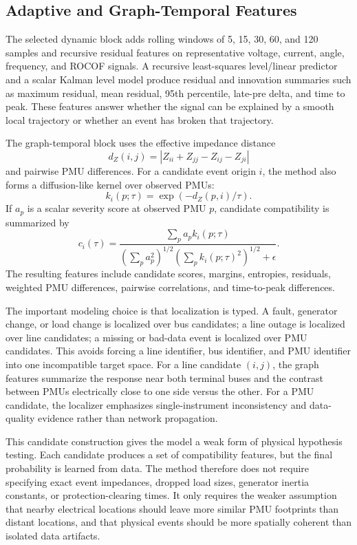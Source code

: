 \documentclass[conference]{IEEEtran}
\begin{document}
\subsection{Adaptive and Graph-Temporal Features}
The selected dynamic block adds rolling windows of 5, 15, 30, 60, and 120 samples and recursive residual features on representative voltage, current, angle, frequency, and ROCOF signals. A recursive least-squares level/linear predictor and a scalar Kalman level model produce residual and innovation summaries such as maximum residual, mean residual, 95th percentile, late-pre delta, and time to peak. These features answer whether the signal can be explained by a smooth local trajectory or whether an event has broken that trajectory.

The graph-temporal block uses the effective impedance distance
\begin{equation}
d_Z(i,j)=\left|Z_{ii}+Z_{jj}-Z_{ij}-Z_{ji}\right|
\end{equation}
and pairwise PMU differences. For a candidate event origin $i$, the method also forms a diffusion-like kernel over observed PMUs:
\begin{equation}
k_i(p;\tau)=\exp\left(-d_Z(p,i)/\tau\right).
\end{equation}
If $a_p$ is a scalar severity score at observed PMU $p$, candidate compatibility is summarized by
\begin{equation}
c_i(\tau)=
\frac{\sum_p a_p k_i(p;\tau)}
{\left(\sum_p a_p^2\right)^{1/2}
 \left(\sum_p k_i(p;\tau)^2\right)^{1/2}+\epsilon}.
\end{equation}
The resulting features include candidate scores, margins, entropies, residuals, weighted PMU differences, pairwise correlations, and time-to-peak differences.

The important modeling choice is that localization is typed. A fault, generator change, or load change is localized over bus candidates; a line outage is localized over line candidates; a missing or bad-data event is localized over PMU candidates. This avoids forcing a line identifier, bus identifier, and PMU identifier into one incompatible target space. For a line candidate $(i,j)$, the graph features summarize the response near both terminal buses and the contrast between PMUs electrically close to one side versus the other. For a PMU candidate, the localizer emphasizes single-instrument inconsistency and data-quality evidence rather than network propagation.

This candidate construction gives the model a weak form of physical hypothesis testing. Each candidate produces a set of compatibility features, but the final probability is learned from data. The method therefore does not require specifying exact event impedances, dropped load sizes, generator inertia constants, or protection-clearing times. It only requires the weaker assumption that nearby electrical locations should leave more similar PMU footprints than distant locations, and that physical events should be more spatially coherent than isolated data artifacts.
\end{document}

